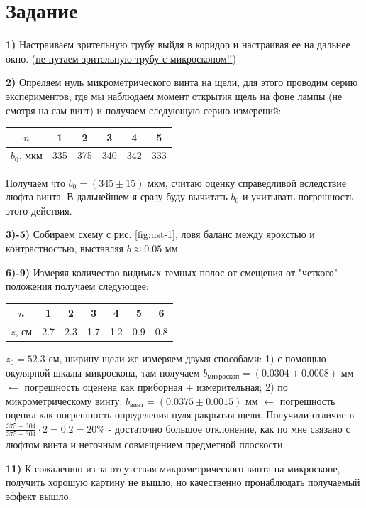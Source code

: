 \documentclass[a4paper,12pt]{extarticle}
\begin{document}
\section*{Задание}
\textbf{1)} Настраиваем зрительную трубу выйдя в коридор и настраивая ее на дальнее окно. (\underline{не путаем зрительную трубу с микроскопом!!})

\textbf{2)} Опреляем нуль микрометрического винта на щели, для этого проводим серию экспериментов, где мы наблюдаем момент открытия щель на фоне лампы (не смотря на сам винт) и получаем следующую серию измерений: 
\begin{tabular}{|c|c|c|c|c|c|}
\hline
$n$    & 1   & 2   & 3   & 4   & 5   \\ \hline
$b_0$, мкм & 335 & 375 & 340 & 342 & 333 \\ \hline
\end{tabular}

Получаем что $b_0 = (345\pm15)$ мкм, считаю оценку справедливой вследствие люфта винта. В дальнейшем я сразу буду вычитать $b_0$ и учитывать погрешность этого действия.

\textbf{3)-5)} Собираем схему с рис. \ref{fig:ust-1}, ловя баланс между ярокстью и контрастностью, выставляя $b \approx 0.05$ мм.

\textbf{6)-9)} Измеряя количество видимых темных полос от смещения от "четкого" положения получаем следующее: \\
\begin{tabular}{|c|c|c|c|c|c|c|}
\hline
$n$ & 1   & 2   & 3   & 4   & 5   & 6   \\ \hline
$z$, см & 2.7 & 2.3 & 1.7 & 1.2 & 0.9 & 0.8 \\ \hline
\end{tabular}

$z_0 = 52.3$ см, ширину щели же измеряем двумя способами: 1) с помощью окулярной шкалы микроскопа, там получаем $b_{\text{микроскоп}} = (0.0304\pm0.0008)$ мм $\leftarrow$ погрешность оценена как приборная + измерительная; 2) по микрометрическому винту: $b_{\text{винт}} = (0.0375\pm0.0015)$ мм $\leftarrow$ погрешность оценил как погрешность определения нуля ракрытия щели. Получили отличие в $\frac{375-304}{375+304} \cdot 2 = 0.2 = 20\%$ - достаточно большое отклонение, как по мне связано с люфтом винта и неточным совмещением предметной плоскости.

\textbf{11)} К сожалению из-за отсутствия микрометрического винта на микроскопе, получить хорошую картину не вышло, но качественно пронаблюдать получаемый эффект вышло.
\end{document}
